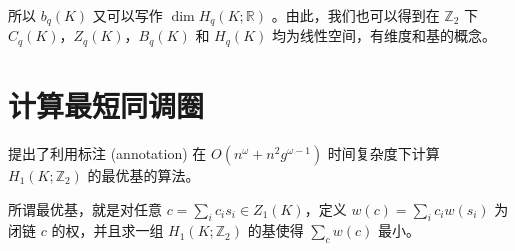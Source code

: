 所以 $ b_q(K) $ 又可以写作 $ \dim H_q(K; \mathbb{R}) $ 。由此，我们也可以得到在 $ \mathbb{Z}_2 $ 下 $ C_q(K) $，$ Z_q(K) $，$ B_q(K) $ 和 $ H_q(K) $ 均为线性空间，有维度和基的概念。

\section{计算最短同调圈}

\citet{Busaryev2012} 提出了利用标注 (annotation) 在 $ O(n^\omega + n^2 g^{\omega - 1}) $ 时间复杂度下计算 $ H_1(K; \mathbb{Z}_2) $ 的最优基的算法。

所谓最优基，就是对任意 $ c = \sum_i c_i s_i \in Z_1(K) $，定义 $ w(c) = \sum_i c_i w(s_i) $ 为闭链 $ c $ 的权，并且求一组 $ H_1(K; \mathbb{Z}_2) $ 的基使得 $ \sum_{c} w(c) $ 最小。

